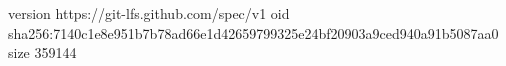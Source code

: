 version https://git-lfs.github.com/spec/v1
oid sha256:7140c1e8e951b7b78ad66e1d42659799325e24bf20903a9ced940a91b5087aa0
size 359144
